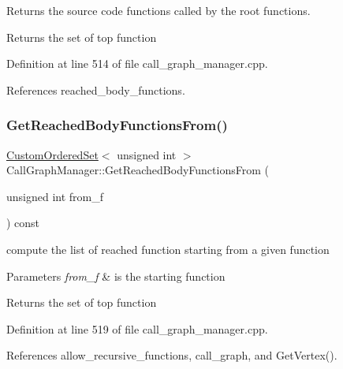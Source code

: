 Returns the source code functions called by the root functions. 

\begin{DoxyReturn}{Returns}
the set of top function 
\end{DoxyReturn}


Definition at line 514 of file call\+\_\+graph\+\_\+manager.\+cpp.



References reached\+\_\+body\+\_\+functions.

\mbox{\label{classCallGraphManager_ada5792c79efd5eb5646ee1f3fe6651f7}} 
\subsubsection{\texorpdfstring{Get\+Reached\+Body\+Functions\+From()}{GetReachedBodyFunctionsFrom()}}
{\footnotesize\ttfamily \hyperlink{classCustomOrderedSet}{Custom\+Ordered\+Set}$<$ unsigned int $>$ Call\+Graph\+Manager\+::\+Get\+Reached\+Body\+Functions\+From (\begin{DoxyParamCaption}\item[{unsigned int}]{from\+\_\+f }\end{DoxyParamCaption}) const}



compute the list of reached function starting from a given function 


\begin{DoxyParams}{Parameters}
{\em from\+\_\+f} & is the starting function \\
\hline
\end{DoxyParams}
\begin{DoxyReturn}{Returns}
the set of top function 
\end{DoxyReturn}


Definition at line 519 of file call\+\_\+graph\+\_\+manager.\+cpp.



References allow\+\_\+recursive\+\_\+functions, call\+\_\+graph, and Get\+Vertex().

